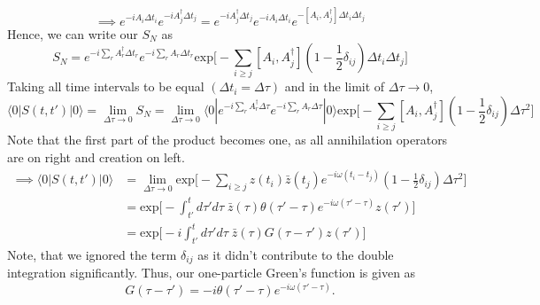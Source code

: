 \documentclass{article}
\begin{document}
\begin{equation}
	\implies  e^{-iA_i \Delta t_{i}} e^{-iA^\dagger_j \Delta t_{j} } = e^{-iA^\dagger_j \Delta t_{j} }e^{-iA_i \Delta t_{i}} e^{-[A_i, A^\dagger _j]\Delta t_i \Delta t_j}
\end{equation}
Hence, we can write our $S_N$ as
\begin{equation}
	S_N = e^{-i\sum_r A^\dagger _r \Delta t_r}e^{-i\sum_r A_r \Delta t_r} \mathrm{exp} \bigg[ -\sum _{i \geq j} [A_i, A^\dagger _j] (1-\frac{1}{2}\delta_{ij}) \Delta t_i \Delta t_j \bigg]
\end{equation}
Taking all time intervals to be equal $(\Delta t_i = \Delta \tau)$ and in the limit of $\Delta \tau \to 0$,
 \begin{equation}
 	 \langle 0 | S(t,t') | 0 \rangle =  \lim_{\Delta \tau \to 0}S_N = \lim_{\Delta \tau \to 0} \langle 0 | e^{-i\sum_r A^\dagger _r \Delta \tau}e^{-i\sum_r A_r \Delta \tau} | 0 \rangle \mathrm{exp} \bigg[ -\sum _{i \geq j} [A_i, A^\dagger _j] (1-\frac{1}{2}\delta_{ij}) \Delta \tau ^2 \bigg]
 \end{equation}
Note that the first part of the product becomes one, as all annihilation operators are on right and creation on left.
\begin{equation}
	\begin{split}
			\implies  \langle 0 | S(t,t') | 0 \rangle &= \lim_{\Delta \tau \to 0} \mathrm{exp} \bigg[ -\sum _{i \geq j} z(t_i)\bar{z}(t_j) e^{-i\omega (t_i - t_j)}(1-\frac{1}{2}\delta_{ij})\Delta \tau ^2 \bigg]\\
			&= \mathrm{exp} \bigg[ -\int_{t'}^t d\tau' d\tau \; \bar{z}(\tau)\theta (\tau'-\tau) e^{-i\omega (\tau' - \tau)}z(\tau') \bigg]\\
			&=  \mathrm{exp} \bigg[ -i\int_{t'}^t d\tau' d\tau \; \bar{z}(\tau) G (\tau - \tau')z(\tau') \bigg]
	\end{split}
\end{equation}
Note, that we ignored the term $\delta_{ij}$ as it didn't contribute to the double integration significantly. Thus, our one-particle Green's function is given as
\begin{equation}
	G (\tau - \tau') = -i \theta (\tau'-\tau) e^{-i\omega (\tau' - \tau)}.
\end{equation}
\end{document}
